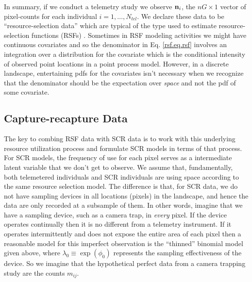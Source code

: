 In summary, if we conduct a telemetry study we observe ${\bf n}_{i}$,
the $nG \times 1$ vector of pixel-counts for each individual
$i=1,\ldots,N_{tel}$.  We declare these data to be
``resource-selection data'' which are typical of the type used to
estimate resource-selection functions (RSFs) \citep{manly_etal:2002}.
Sometimes in RSF modeling activities we might have
continuous covariates and so the denominator in Eq. \ref{rsf.eq.rsf}
involves an integration over a distribution for the covariate which is
the conditional intensity of observed point locations in a point
process model. However, in a discrete landscape, entertaining pdfs for
the covariates isn't necessary \citep{royle_etal:2012mee} when we
recognize that the denominator should be the expectation over {\it
  space} and not the pdf of some covariate.


\subsection{Capture-recapture Data}

The key to combing RSF data with SCR data is to work with this
underlying resource utilization process and formulate SCR models in
terms of that process. For SCR models, the frequency of use for each pixel
serves as a intermediate
latent variable that we don't get to observe. We assume that, fundamentally,
both telemetered individuals and SCR individuals are using space
according to the same resource selection model. The difference is that,
for SCR data, we
do not have sampling devices in all locations (pixels) in the landscape, and hence the
data are only recorded at a subsample of them.
In other words, imagine that we have a sampling device, such as a
camera trap, in {\it every} pixel. If the device operates continually
then it is no different from a telemetry instrument.
If it
operates  intermittently and does not expose the entire area of
each pixel then a reasonable model for this imperfect observation is
the ``thinned'' binomial model given above, where $\lambda_{0} \equiv \exp(\phi_{0})$
represents the sampling effectiveness of the device. So we imagine
that the hypothetical perfect data from a camera trapping study are
the counts $m_{ij}$.

